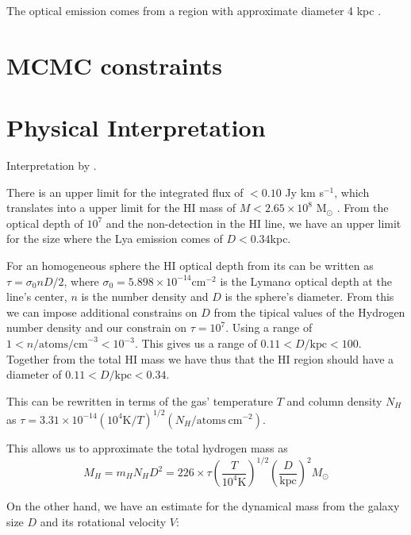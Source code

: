 \documentclass[a4paper, usenatbib, 12pt]{article}
\begin{document}
{The optical emission  comes from a   region with approximate diameter
4 kpc \cite{Fricke01}. 

\section*{MCMC constraints}

\section*{Physical Interpretation}

Interpretation by \cite{mashesse03}.

There is an upper limit for the  
integrated flux of $<0.10$ Jy km s$^{-1}$, which translates into a
upper limit for the HI mass of $M<2.65\times 10^{8}$ M$_{\odot}$
\cite{pustilnikmartin07}. 
From the optical depth of $10^7$ and the non-detection in the HI line,
we have an upper limit for the size where the Lya emission comes of
$D<0.34$kpc. 

 For an homogeneous sphere the HI optical depth from its can be
 written as $\tau = \sigma_0 n D/2$, where $\sigma_0=5.898\times
10^{-14}$cm$^{-2}$ is the Lyman$\alpha$  optical depth at the 
line's center, $n$ is the number density and $D$ is the sphere's
diameter. 
From this we can impose additional constrains on $D$ from the tipical
values of the Hydrogen number density and our constrain on
$\tau=10^{7}$.  Using a range of $1<n/\mathrm{atoms/cm}^{-3} <
10^{-3}$. This gives us a range of $0.11 < D/\mathrm{kpc}<100$. 
Together from the total HI mass we have thus that the HI region should
have a diameter of $0.11 < D/\mathrm{kpc}<0.34$.



This can be rewritten in terms of the gas' temperature $T$ and column
density $N_{H}$as $\tau = 3.31 \times 10^{-14} (10^{4}\mathrm{K}/T)^{1/2}
(N_{H}/\mathrm{atoms\ cm}^{-2})$.  

This allows us to approximate the total hydrogen mass as
\begin{equation}
M_{H} = m_{H}  N_{H} D^{2} = 226\times \tau  \left(\frac{T}{10^4
  \mathrm{K}}\right)^{1/2}\left(\frac{D}{\mathrm{kpc}}\right)^2M_{\odot}
\end{equation}





On the other hand, we have an estimate for the dynamical mass from the
galaxy size $D$ and its rotational velocity $V$:



}
\end{document}
